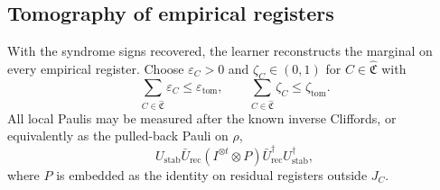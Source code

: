 \documentclass[
  aps,
  prx,
  reprint,
  superscriptaddress,
  amsmath,
  amssymb,
  nofootinbib,
  longbibliography
]{revtex4-2}
\begin{document}
\subsection{Tomography of empirical registers}

With the syndrome signs recovered, the learner reconstructs the marginal
on every empirical register.
Choose $\varepsilon_C>0$ and $\zeta_C\in(0,1)$ for
$C\in\widehat{\mathfrak C}$ with
\begin{equation}
\sum_{C\in\widehat{\mathfrak C}}\varepsilon_C
\le\varepsilon_{\mathrm{tom}},
\qquad
\sum_{C\in\widehat{\mathfrak C}}\zeta_C
\le\zeta_{\mathrm{tom}}.
\label{eq:supp-empirical-tomography-local-budgets}
\end{equation}
All local Paulis may be measured after the known inverse Cliffords, or
equivalently as the pulled-back Pauli on $\rho$,
\begin{equation}
U_{\mathrm{stab}}\bar U_{\mathrm{rec}}
\left(I^{\otimes t}\otimes P\right)
\bar U_{\mathrm{rec}}^\dagger U_{\mathrm{stab}}^\dagger,
\label{eq:supp-empirical-pauli-pullback}
\end{equation}
where $P$ is embedded as the identity on residual registers outside
$J_C$.
\end{document}
